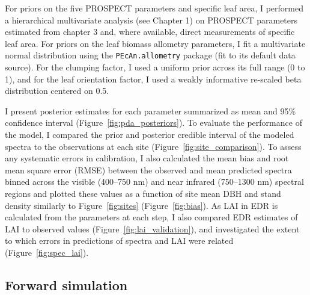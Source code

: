 For priors on the five PROSPECT parameters and specific leaf area, I performed a hierarchical multivariate analysis (see Chapter 1) on PROSPECT parameters estimated from chapter 3 and, where available, direct measurements of specific leaf area. 
For priors on the leaf biomass allometry parameters, I fit a multivariate normal distribution using the \texttt{PEcAn.allometry} package (fit to its default data source). %
% 
% 
For the clumping factor, I used a uniform prior across its full range (0 to 1), and for the leaf orientation factor, I used a weakly informative re-scaled beta distribution centered on 0.5.

I present posterior estimates for each parameter summarized as mean and 95\% confidence interval (Figure~\ref{fig:pda_posteriors}).
To evaluate the performance of the model, I compared the prior and posterior credible interval of the modeled spectra to the observations at each site (Figure~\ref{fig:site_comparison}).
% 
% 
To assess any systematic errors in calibration, I also calculated the mean bias and root mean square error (RMSE) between the observed and mean predicted spectra binned across the visible (400--750 nm) and near infrared (750--1300 nm) spectral regions and plotted these values as a function of site mean DBH and stand density similarly to Figure~\ref{fig:sites} (Figure~\ref{fig:bias}).
As LAI in EDR is calculated from the parameters at each step, I also compared EDR estimates of LAI to observed values (Figure~\ref{fig:lai_validation}), and investigated the extent to which errors in predictions of spectra and LAI were related (Figure~\ref{fig:spec_lai}).

\subsection{Forward simulation}

